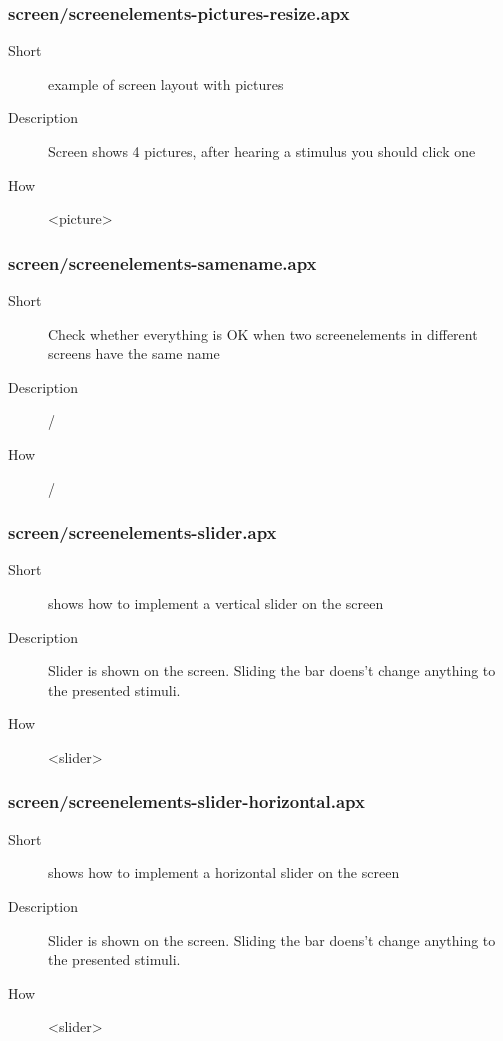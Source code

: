 \subsubsection{screen/screenelements-pictures-resize.apx}
\begin{description}
\item[Short] 
 example of screen layout with pictures
\item[Description] 
 Screen shows 4 pictures, after hearing a stimulus you should click one
\item[How] 
 \textless{}picture\textgreater{}
\end{description}

\subsubsection{screen/screenelements-samename.apx}
\begin{description}
\item[Short] 
 Check whether everything is OK when two screenelements in different screens have the same name
\item[Description] 
 /
\item[How] 
 /
\end{description}

\subsubsection{screen/screenelements-slider.apx}
\begin{description}
\item[Short] 
 shows how to implement a vertical slider on the screen
\item[Description] 
 Slider is shown on the screen. Sliding the bar doens't change anything to the presented stimuli.
\item[How] 
 \textless{}slider\textgreater{}
\end{description}

\subsubsection{screen/screenelements-slider-horizontal.apx}
\begin{description}
\item[Short] 
 shows how to implement a horizontal slider on the screen
\item[Description] 
 Slider is shown on the screen. Sliding the bar doens't change anything to the presented stimuli.
\item[How] 
 \textless{}slider\textgreater{}
\end{description}

